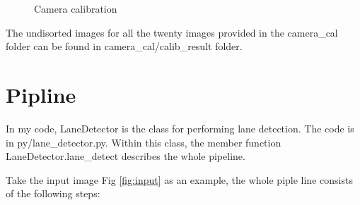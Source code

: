 \documentclass[12pt]{article}
\begin{document}
\begin{figure}[h]
\centering
{}
\qquad
{}
\qquad
{}
\qquad
{}
\caption{Camera calibration}
\end{figure}

The undisorted images for all the twenty images provided in the  camera\_cal folder can be found in  camera\_cal/calib\_result folder.
  
    
\section{Pipline}
In my code, LaneDetector is the class for performing lane detection. The code is in py/lane\_detector.py. Within this class, the member function LaneDetector.lane\_detect describes the whole pipeline.

Take the input image Fig \ref{fig:input} as an example, the whole piple line consists of the following steps:
\end{document}
